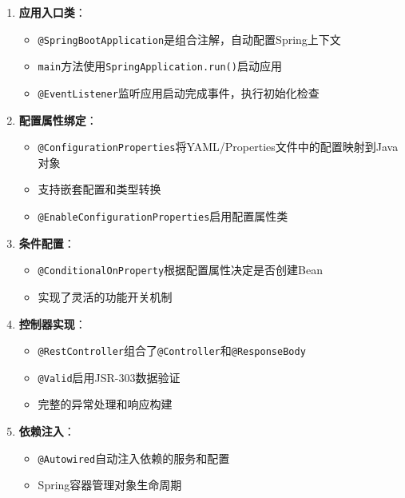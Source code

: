 \begin{enumerate}
\def\labelenumi{\arabic{enumi}.}
\tightlist
\item
  \textbf{应用入口类}：

  \begin{itemize}
  \tightlist
  \item
    \texttt{@SpringBootApplication}是组合注解，自动配置Spring上下文
  \item
    \texttt{main}方法使用\texttt{SpringApplication.run()}启动应用
  \item
    \texttt{@EventListener}监听应用启动完成事件，执行初始化检查
  \end{itemize}
\item
  \textbf{配置属性绑定}：

  \begin{itemize}
  \tightlist
  \item
    \texttt{@ConfigurationProperties}将YAML/Properties文件中的配置映射到Java对象
  \item
    支持嵌套配置和类型转换
  \item
    \texttt{@EnableConfigurationProperties}启用配置属性类
  \end{itemize}
\item
  \textbf{条件配置}：

  \begin{itemize}
  \tightlist
  \item
    \texttt{@ConditionalOnProperty}根据配置属性决定是否创建Bean
  \item
    实现了灵活的功能开关机制
  \end{itemize}
\item
  \textbf{控制器实现}：

  \begin{itemize}
  \tightlist
  \item
    \texttt{@RestController}组合了\texttt{@Controller}和\texttt{@ResponseBody}
  \item
    \texttt{@Valid}启用JSR-303数据验证
  \item
    完整的异常处理和响应构建
  \end{itemize}
\item
  \textbf{依赖注入}：

  \begin{itemize}
  \tightlist
  \item
    \texttt{@Autowired}自动注入依赖的服务和配置
  \item
    Spring容器管理对象生命周期
  \end{itemize}
\end{enumerate}

